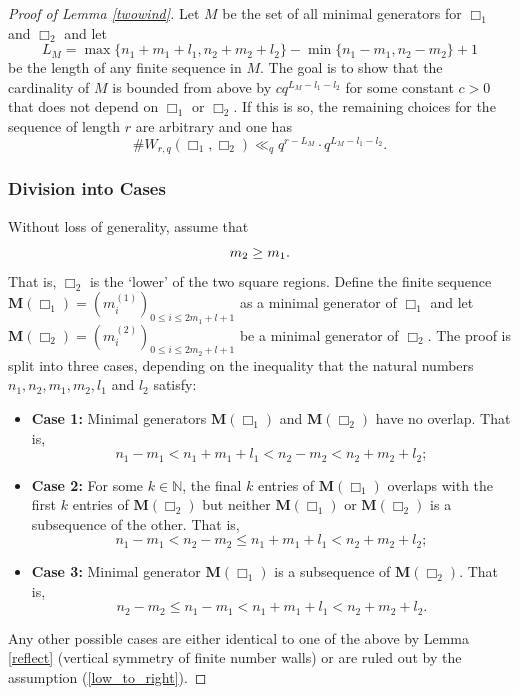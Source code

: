 \documentclass{article}
\theoremstyle{definition}
\newcommand{\N}{\mathbb{N}}
\numberwithin{equation}{subsection}
\begin{document}
\begin{proof}[Proof of Lemma \ref{twowind}]

\noindent Let $M$ be the set of all minimal generators for $\Box_1$ and $\Box_2$ and let $$L_M=\max\{n_1+m_1+l_1, n_2+m_2+l_2\}-\min\{n_1-m_1,n_2-m_2\} +1$$ be the length of any finite sequence in $M$. The goal is to show that the cardinality of $M$ is bounded from above by $cq^{L_M-l_1-l_2}$ for some constant $c>0$ that does not depend on $\Box_1$ or $\Box_2$. If this is so, the remaining choices for the sequence of length $r$ are arbitrary and one has $$\#W_{r,q}(\Box_1,\Box_2)\ll_q q^{r-L_M}\cdot q^{L_M-l_1-l_2}.$$ 
\subsubsection*{Division into Cases}
\noindent  Without loss of generality, assume that\begin{equation}\vspace{-0.2cm}
    m_2\ge m_1. \label{low_to_right}
\end{equation}That is, $\Box_2$ is the `lower' of the two square regions. Define the finite sequence $\mathbf{M}(\Box_1)=(m_i^{(1)})_{0\le i \le 2m_1+l+1}$ as a minimal generator of $\Box_1$ and let $\mathbf{M}(\Box_2)=(m_i^{(2)})_{0\le i \le 2m_2+l+1}$ be a minimal generator of $\Box_2$. The proof is split into three cases, depending on the inequality that the natural numbers $n_1,n_2,m_1,m_2,l_1$ and $l_2$ satisfy:\begin{itemize}
    
\item[]{\textbf{Case 1:}} Minimal generators $\mathbf{M}(\Box_1)$ and $\mathbf{M}(\Box_2)$ have no overlap. That is,$$n_1-m_1<n_1+m_1+l_1<n_2-m_2<n_2+m_2+l_2;$$  

\item[]{\textbf{Case 2:}} For some $k\in\N$, the final $k$ entries of $\mathbf{M}(\Box_1)$ overlaps with the first $k$ entries of $\mathbf{M}(\Box_2)$ but neither $\mathbf{M}(\Box_1)$ or $\mathbf{M}(\Box_2)$ is a subsequence of the other. That is, $$n_1-m_1<n_2-m_2\le n_1+m_1+l_1< n_2+m_2+l_2;$$

\item[]{\textbf{Case 3:}} Minimal generator $\mathbf{M}(\Box_1)$ is a subsequence of $\mathbf{M}(\Box_2)$. That is, $$n_2-m_2\le n_1-m_1 < n_1+m_1+l_1<n_2+m_2+l_2.$$
\end{itemize}
\noindent Any other possible cases are either identical to one of the above by Lemma \ref{reflect} (vertical symmetry of finite number walls) or are ruled out by the assumption (\ref{low_to_right}). 


\end{proof}
\end{document}
